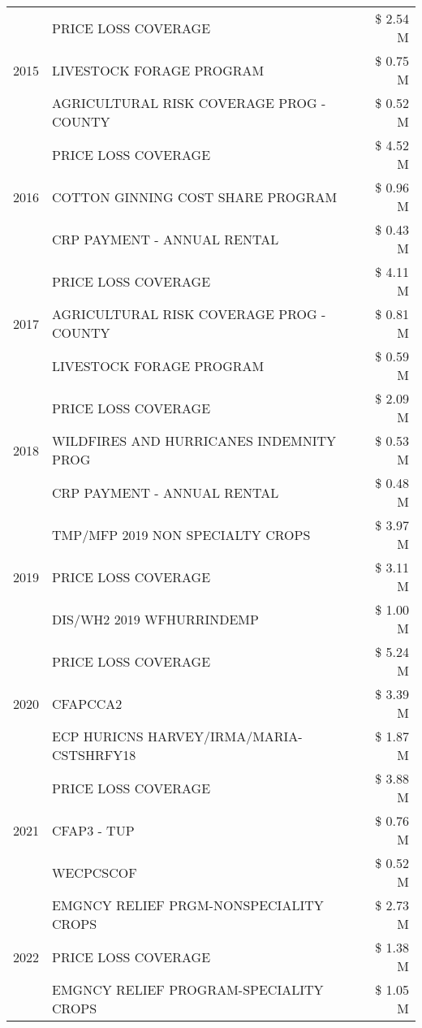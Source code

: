 \begin{tabular}{llr}
\cline{1-3}
\multirow[t]{3}{*}{2015} & PRICE LOSS COVERAGE & \$ 2.54 M \\
 & LIVESTOCK FORAGE PROGRAM & \$ 0.75 M \\
 & AGRICULTURAL RISK COVERAGE PROG - COUNTY & \$ 0.52 M \\
\cline{1-3}
\multirow[t]{3}{*}{2016} & PRICE LOSS COVERAGE & \$ 4.52 M \\
 & COTTON GINNING COST SHARE PROGRAM & \$ 0.96 M \\
 & CRP PAYMENT - ANNUAL RENTAL & \$ 0.43 M \\
\cline{1-3}
\multirow[t]{3}{*}{2017} & PRICE LOSS COVERAGE & \$ 4.11 M \\
 & AGRICULTURAL RISK COVERAGE PROG - COUNTY & \$ 0.81 M \\
 & LIVESTOCK FORAGE PROGRAM & \$ 0.59 M \\
\cline{1-3}
\multirow[t]{3}{*}{2018} & PRICE LOSS COVERAGE & \$ 2.09 M \\
 & WILDFIRES AND HURRICANES INDEMNITY PROG & \$ 0.53 M \\
 & CRP PAYMENT - ANNUAL RENTAL & \$ 0.48 M \\
\cline{1-3}
\multirow[t]{3}{*}{2019} & TMP/MFP 2019 NON SPECIALTY CROPS & \$ 3.97 M \\
 & PRICE LOSS COVERAGE & \$ 3.11 M \\
 & DIS/WH2 2019 WFHURRINDEMP & \$ 1.00 M \\
\cline{1-3}
\multirow[t]{3}{*}{2020} & PRICE LOSS COVERAGE & \$ 5.24 M \\
 & CFAPCCA2 & \$ 3.39 M \\
 & ECP HURICNS HARVEY/IRMA/MARIA-CSTSHRFY18 & \$ 1.87 M \\
\cline{1-3}
\multirow[t]{3}{*}{2021} & PRICE LOSS COVERAGE & \$ 3.88 M \\
 & CFAP3 - TUP & \$ 0.76 M \\
 & WECPCSCOF & \$ 0.52 M \\
\cline{1-3}
\multirow[t]{3}{*}{2022} & EMGNCY RELIEF PRGM-NONSPECIALITY CROPS & \$ 2.73 M \\
 & PRICE LOSS COVERAGE & \$ 1.38 M \\
 & EMGNCY RELIEF PROGRAM-SPECIALITY CROPS & \$ 1.05 M \\
\cline{1-3}
\bottomrule
\end{tabular}
